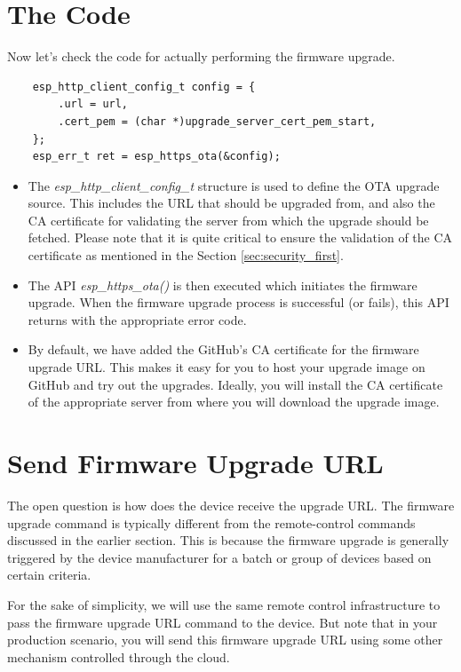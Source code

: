 \documentclass[main.tex]{subfiles}
\begin{document}
\section{The Code}
Now let's check the code for actually performing the firmware upgrade.

\begin{verbatim}
    esp_http_client_config_t config = {
        .url = url,
        .cert_pem = (char *)upgrade_server_cert_pem_start,
    };
    esp_err_t ret = esp_https_ota(&config);
\end{verbatim}

\begin{itemize}
    \item The \textit{esp\_http\_client\_config\_t} structure is used to define the OTA upgrade source. This includes the URL that should be upgraded from, and also the CA certificate for validating the server from which the upgrade should be fetched. Please note that it is quite critical to ensure the validation of the CA certificate as mentioned in the Section \ref{sec:security_first}.
    \item The API \textit{esp\_https\_ota()} is then executed which initiates the firmware upgrade. When the firmware upgrade process is successful (or fails), this API returns with the appropriate error code.
    \item By default, we have added the GitHub's CA certificate for the firmware upgrade URL. This makes it easy for you to host your upgrade image on GitHub and try out the upgrades. Ideally, you will install the CA certificate of the appropriate server from where you will download the upgrade image.
\end{itemize}

\section{Send Firmware Upgrade URL}
The open question is how does the device receive the upgrade URL. The firmware upgrade command is typically different from the remote-control commands discussed in the earlier section. This is because the firmware upgrade is generally triggered by the device manufacturer for a batch or group of devices based on certain criteria.

For the sake of simplicity, we will use the same remote control infrastructure to pass the firmware upgrade URL command to the device. But note that in your production scenario, you will send this firmware upgrade URL using some other mechanism controlled through the cloud.
\end{document}
